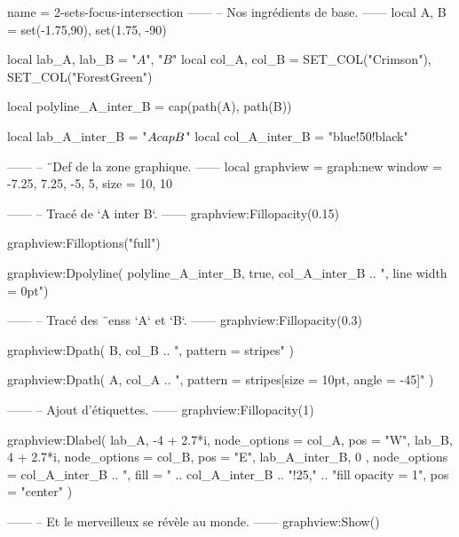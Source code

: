 \documentclass{standalone}
\begin{document}
\begin{luadraw}{name = 2-sets-focus-intersection}
------
-- Nos ingrédients de base.
------
local A, B = set(-1.75,90), set(1.75, -90)

local lab_A, lab_B = "$A$", "$B$"
local col_A, col_B = SET_COL("Crimson"), SET_COL("ForestGreen")

local polyline_A_inter_B = cap(path(A), path(B))

local lab_A_inter_B       = "$A \\cap B$"
local col_A_inter_B       = "blue!50!black"

------
-- ¨Def de la zone graphique.
------
local graphview = graph:new{
  window = {-7.25, 7.25, -5, 5},
  size   = {10, 10}
}

------
-- Tracé de `A inter B`.
------
graphview:Fillopacity(0.15)

graphview:Filloptions("full")

graphview:Dpolyline(
  polyline_A_inter_B,
  true,
  col_A_inter_B .. ", line width = 0pt")

------
-- Tracé des ¨enss `A` et `B`.
------
graphview:Fillopacity(0.3)

graphview:Dpath(
  B,
  col_B .. ", pattern = stripes"
)

graphview:Dpath(
  A,
  col_A .. ", pattern = {stripes[size = 10pt, angle = -45]}"
)


------
-- Ajout d'étiquettes.
------
graphview:Fillopacity(1)

graphview:Dlabel(
  lab_A, -4 + 2.7*i, {node_options = col_A, pos = "W"},
  lab_B, 4 + 2.7*i, {node_options = col_B, pos = "E"},
  lab_A_inter_B, 0 , {
    node_options = col_A_inter_B
                .. ", fill = " .. col_A_inter_B .. "!25,"
                .. "fill opacity = 1",
    pos = "center"
  })

------
-- Et le merveilleux se révèle au monde.
------
graphview:Show()
\end{luadraw}
\end{document}
